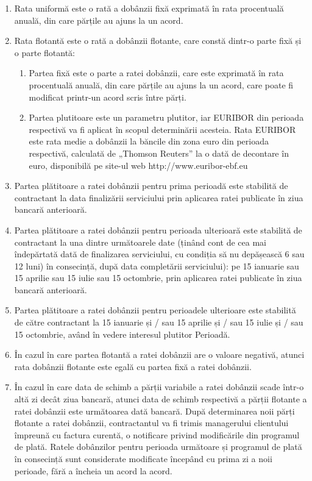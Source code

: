 \begin{enumerate}
\item Rata uniformă este o rată a dobânzii fixă ​​exprimată în rata procentuală anuală, din care părțile au ajuns la un acord.

\item Rata flotantă este o rată a dobânzii flotante, care constă dintr-o parte fixă ​​și o parte flotantă:

  \begin{enumerate}
  \item Partea fixă ​​este o parte a ratei dobânzii, care este exprimată în rata procentuală anuală, din care părțile au ajuns la un acord, care poate fi modificat printr-un acord scris între părți.
  \item Partea plutitoare este un parametru plutitor, iar EURIBOR din perioada respectivă va fi aplicat în scopul determinării acesteia. Rata EURIBOR este rata medie a dobânzii la băncile din zona euro din perioada respectivă, calculată de „Thomson Reuters” la o dată de decontare în euro, disponibilă pe site-ul web http://www.euribor-ebf.eu
  \end{enumerate}

\item Partea plătitoare a ratei dobânzii pentru prima perioadă este stabilită de contractant la data finalizării serviciului prin aplicarea ratei publicate în ziua bancară anterioară.

\item Partea plătitoare a ratei dobânzii pentru perioada ulterioară este stabilită de contractant la una dintre următoarele date (ținând cont de cea mai îndepărtată dată de finalizarea serviciului, cu condiția să nu depășească 6 sau 12 luni) în consecință, după data completării serviciului): pe 15 ianuarie sau 15 aprilie sau 15 iulie sau 15 octombrie, prin aplicarea ratei publicate în ziua bancară anterioară.

\item Partea plătitoare a ratei dobânzii pentru perioadele ulterioare este stabilită de către contractant la 15 ianuarie și / sau 15 aprilie și / sau 15 iulie și / sau 15 octombrie, având în vedere interesul plutitor Perioadă.

\item În cazul în care partea flotantă a ratei dobânzii are o valoare negativă, atunci rata dobânzii flotante este egală cu partea fixă ​​a ratei dobânzii.

\item În cazul în care data de schimb a părții variabile a ratei dobânzii scade într-o altă zi decât ziua bancară, atunci data de schimb respectivă a părții flotante a ratei dobânzii este următoarea dată bancară. După determinarea noii părți flotante a ratei dobânzii, contractantul va fi trimis managerului clientului împreună cu factura curentă, o notificare privind modificările din programul de plată. Ratele dobânzilor pentru perioada următoare și programul de plată în consecință sunt considerate modificate începând cu prima zi a noii perioade, fără a încheia un acord la acord.


\end{enumerate}

